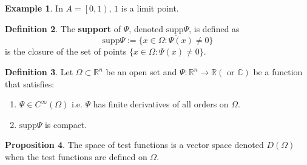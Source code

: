 \documentclass[12pt,a4paper]{article}
\theoremstyle{definition}
\newtheorem{definition}{Definition}[subsection]
\newtheorem{proposition}[definition]{Proposition}
\newtheorem{example}[definition]{Example}
\begin{document}
\begin{example}
	In $A = \left[0, 1 \right)$, $1$ is a limit point.
\end{example}

\begin{definition}
	The \textbf{support} of $\Psi$, denoted $\text{supp} \Psi$, is defined as
	\[
		\text{supp} \Psi := \overline{\{ x \in \Omega: \Psi(x) \ne 0 \}}
	\]
	is the closure of the set of points $\{ x \in \Omega: \Psi(x) \ne 0 \}$.
\end{definition}

\begin{definition}
	Let $\Omega \subset \mathbb{R}^n$ be an open set and $\Psi: \mathbb{R}^n \rightarrow \mathbb{R} (\text{ or } \mathbb{C})$ be a function that satisfies:
	\begin{enumerate}
		\item $\Psi \in C^{\infty} (\Omega)$ i.e. $\Psi$ has finite derivatives of all orders on $\Omega$.
		\item $\text{supp} \Psi$ is compact.
	\end{enumerate}
\end{definition}

\begin{proposition}
	The space of test functions is a vector space denoted $D(\Omega)$ when the test functions are defined on $\Omega$.
\end{proposition}
\end{document}
